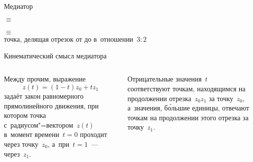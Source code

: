 \begin{frame}{Медиатор}
\begin{center}
\LARGE
{}\quad$\equiv$\quad{}\\[3ex]
\\
$\equiv$\\
{\normalsize точка, делящая отрезок от  до 
в~отношении~$3:2$}
\end{center}
\end{frame}

\begin{frame}{Кинематический смысл медиатора}
\begin{columns}

Между прочим, выражение
	\[
	z(t)=(1-t)z_0+tz_1
	\]
задаёт закон равномерного прямолинейного движения, при котором точка
с~радиусом"=вектором~$z(t)$ в~момент времени~$t=0$ проходит через точку~$z_0$,
а~при~$t=1$~— через~$z_1$.

\bigskip
Отрицательные значения~$t$ соответствуют точкам, находящимся на продолжении
отрезка~$z_0z_1$ за точку~$z_0$, а~значения, бо́льшие единицы, отвечают точкам
на продолжении этого отрезка за точку~$z_1$.
\end{columns}
\end{frame}
